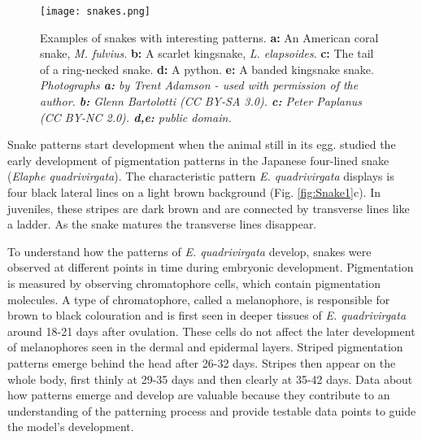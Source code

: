 \newcommand{\CpyMsg}[1]{\textcopyright{} by {#1} - used with permission of the author\footnotemark{}}
\begin{figure}[hb]
	\centering
	\texttt{[image: snakes.png]}
	\caption[Examples of snakes with interesting patterns]{Examples of snakes with interesting patterns. \textbf{a:} An American coral snake, \textit{M. fulvius}. \textbf{b:} A scarlet kingsnake, \textit{L. elapsoides}. \textbf{c:} The tail of a ring-necked snake. \textbf{d:} A python. \textbf{e:} A banded kingsnake snake. \textit{Photographs \textbf{a:} \CpyMsg{Trent Adamson}. \textbf{b:} Glenn Bartolotti (CC BY-SA 3.0). \textbf{c:} Peter Paplanus (CC BY-NC 2.0). \textbf{d,e:} public domain.}}
	\label{fig:realSnakePatterns}
\end{figure}


Snake patterns start development when the animal still in its egg. \citet{murakami2018} studied the early development of pigmentation patterns in the Japanese four-lined snake (\textit{Elaphe quadrivirgata}). The characteristic pattern \textit{E. quadrivirgata} displays is four black lateral lines on a light brown background (Fig. \ref{fig:Snake1}c). In juveniles, these stripes are dark brown and are connected by transverse lines like a ladder. As the snake matures the transverse lines disappear.
 
To understand how the patterns of \textit{E. quadrivirgata} develop, snakes were observed at different points in time during embryonic development. Pigmentation is measured by observing chromatophore cells, which contain pigmentation molecules. A type of chromatophore, called a melanophore, is responsible for brown to black colouration and is first seen in deeper tissues of \textit{E. quadrivirgata} around 18-21 days after ovulation. These cells do not affect the later development of melanophores seen in the dermal and epidermal layers. Striped pigmentation patterns emerge behind the head after 26-32 days. Stripes then appear on the whole body, first thinly at 29-35 days and then clearly at 35-42 days. Data about how patterns emerge and develop are valuable because they contribute to an understanding of the patterning process and provide testable data points to guide the model's development.

